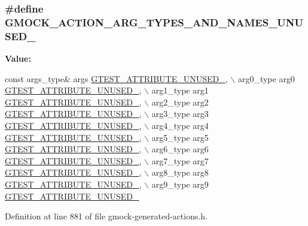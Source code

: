 \subsubsection[{\texorpdfstring{G\+M\+O\+C\+K\+\_\+\+A\+C\+T\+I\+O\+N\+\_\+\+A\+R\+G\+\_\+\+T\+Y\+P\+E\+S\+\_\+\+A\+N\+D\+\_\+\+N\+A\+M\+E\+S\+\_\+\+U\+N\+U\+S\+E\+D\+\_\+}{GMOCK_ACTION_ARG_TYPES_AND_NAMES_UNUSED_}}]{\setlength{\rightskip}{0pt plus 5cm}\#define G\+M\+O\+C\+K\+\_\+\+A\+C\+T\+I\+O\+N\+\_\+\+A\+R\+G\+\_\+\+T\+Y\+P\+E\+S\+\_\+\+A\+N\+D\+\_\+\+N\+A\+M\+E\+S\+\_\+\+U\+N\+U\+S\+E\+D\+\_\+}\hypertarget{gmock-generated-actions_8h_a069f37fdbe36aabe65da6eb6221b9b19}{}\label{gmock-generated-actions_8h_a069f37fdbe36aabe65da6eb6221b9b19}
{\bfseries Value\+:}
\begin{DoxyCode}
\textcolor{keyword}{const} args\_type& args \hyperlink{gtest-port_8h_a01f3b31960fc7c4c7ee4b398a914f89a}{GTEST\_ATTRIBUTE\_UNUSED\_}, \(\backslash\)
    arg0\_type arg0 \hyperlink{gtest-port_8h_a01f3b31960fc7c4c7ee4b398a914f89a}{GTEST\_ATTRIBUTE\_UNUSED\_}, \(\backslash\)
    arg1\_type arg1 \hyperlink{gtest-port_8h_a01f3b31960fc7c4c7ee4b398a914f89a}{GTEST\_ATTRIBUTE\_UNUSED\_}, \(\backslash\)
    arg2\_type arg2 \hyperlink{gtest-port_8h_a01f3b31960fc7c4c7ee4b398a914f89a}{GTEST\_ATTRIBUTE\_UNUSED\_}, \(\backslash\)
    arg3\_type arg3 \hyperlink{gtest-port_8h_a01f3b31960fc7c4c7ee4b398a914f89a}{GTEST\_ATTRIBUTE\_UNUSED\_}, \(\backslash\)
    arg4\_type arg4 \hyperlink{gtest-port_8h_a01f3b31960fc7c4c7ee4b398a914f89a}{GTEST\_ATTRIBUTE\_UNUSED\_}, \(\backslash\)
    arg5\_type arg5 \hyperlink{gtest-port_8h_a01f3b31960fc7c4c7ee4b398a914f89a}{GTEST\_ATTRIBUTE\_UNUSED\_}, \(\backslash\)
    arg6\_type arg6 \hyperlink{gtest-port_8h_a01f3b31960fc7c4c7ee4b398a914f89a}{GTEST\_ATTRIBUTE\_UNUSED\_}, \(\backslash\)
    arg7\_type arg7 \hyperlink{gtest-port_8h_a01f3b31960fc7c4c7ee4b398a914f89a}{GTEST\_ATTRIBUTE\_UNUSED\_}, \(\backslash\)
    arg8\_type arg8 \hyperlink{gtest-port_8h_a01f3b31960fc7c4c7ee4b398a914f89a}{GTEST\_ATTRIBUTE\_UNUSED\_}, \(\backslash\)
    arg9\_type arg9 \hyperlink{gtest-port_8h_a01f3b31960fc7c4c7ee4b398a914f89a}{GTEST\_ATTRIBUTE\_UNUSED\_}
\end{DoxyCode}


Definition at line 881 of file gmock-\/generated-\/actions.\+h.

